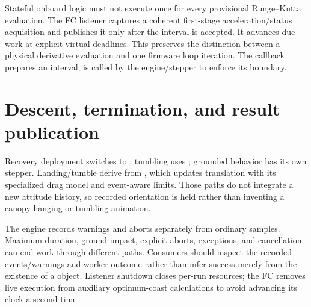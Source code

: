 Stateful onboard logic must not execute once for every provisional Runge--Kutta evaluation. The FC listener captures a coherent first-stage acceleration/status acquisition and publishes it only after the interval is accepted. It advances due work at explicit virtual deadlines. This preserves the distinction between a physical derivative evaluation and one firmware loop iteration. The  callback prepares an interval;  is called by the engine/stepper to enforce its boundary.

\section{Descent, termination, and result publication}
Recovery deployment switches to ; tumbling uses ; grounded behavior has its own stepper. Landing/tumble derive from , which updates translation with its specialized drag model and event-aware limits. Those paths do not integrate a new attitude history, so recorded orientation is held rather than inventing a canopy-hanging or tumbling animation.

The engine records warnings and aborts separately from ordinary samples. Maximum duration, ground impact, explicit aborts, exceptions, and cancellation can end work through different paths. Consumers should inspect the recorded events/warnings and worker outcome rather than infer success merely from the existence of a  object. Listener shutdown closes per-run resources; the FC removes live execution from auxiliary optimum-coast calculations to avoid advancing its clock a second time.



